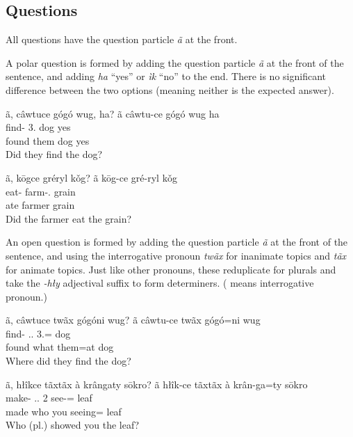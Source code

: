 \subsection{Questions}\label{subsec:questions}
All questions have the question particle \textit{ã} at the front.

A polar question is formed by adding the question particle \textit{ã}
at the front of the sentence,
and adding \textit{ha} ``yes'' or \textit{ìk} ``no'' to the end.
There is no significant difference between the two options
(meaning neither is the expected answer).

\begin{exe}
    \ex
    \glt
    ã, câwtuce gógó wug, ha?
    \glll
    ã câwtu-ce gógó wug ha \\
    \Q{} find-\Pst{} 3\Pl{}.\Anim{} dog yes \\
    \Q{} found them dog yes \\
    \glt
    Did they find the dog?
\end{exe}

\begin{exe}
    \ex
    \glt
    ã, kōgce gréryl kǒg?
    \glll
    ã kōg-ce gré-ryl kǒg \\
    \Q{} eat-\Pst{} farm-\Agt{}.\Anim{} grain \\
    \Q{} ate farmer grain \\
    \glt
    Did the farmer eat the grain?
\end{exe}

An open question is formed by adding the question particle \textit{ã}
at the front of the sentence,
and using the interrogative pronoun \textit{twãx} for inanimate topics
and \textit{tãx} for animate topics.
Just like other pronouns, these reduplicate for plurals
and take the \textit{-hły} adjectival suffix to form determiners.
(\Int{} means interrogative pronoun.)

\begin{exe}
    \ex
    \glt
    ã, câwtuce twãx gógóni wug?
    \glll
    ã câwtu-ce twãx gógó=ni wug \\
    \Q{} find-\Pst{} \Int{}.\Inanim{}.\Sg{} 3\Pl{}.\Anim{}=\InessTwo{} dog \\
    \Q{} found what them=at dog \\
    \glt
    Where did they find the dog?
\end{exe}

\begin{exe}
    \ex
    \glt
    ã, hłîkce tãxtãx à krângaty sōkro?
    \glll
    ã hłîk-ce tãxtãx à krân-ga=ty sōkro \\
    \Q{} make-\Pst{} \Int{}.\Anim{}.\Pl{} 2\Sg{} see-\Ger{}=\Poss{} leaf \\
    \Q{} made who you seeing=\Poss{} leaf \\
    \glt
    Who (pl.) showed you the leaf?
\end{exe}

